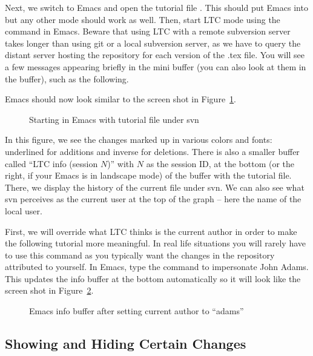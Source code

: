 Next, we switch to Emacs and open the tutorial file .  This should put Emacs into  but any other mode should work as well.  Then, start LTC mode using the command  in Emacs.  Beware that using LTC with a remote subversion server takes longer than using git or a local subversion server, as we have to query the distant server hosting the repository for each version of the .tex file.  You will see a few messages appearing briefly in the mini buffer (you can also look at them in the  buffer), such as the following.
Emacs should now look similar to the screen shot in Figure~\ref{fig:svn-emacs-open}.
\begin{figure}[t]
\centering
{}
\caption{Starting  in Emacs with tutorial file under svn} \label{fig:svn-emacs-open}
\end{figure}
In this figure, we see the changes marked up in various colors and fonts: underlined for additions and inverse for deletions.  There is also a smaller buffer called ``LTC info (session $N$)'' with $N$ as the session ID, at the bottom (or the right, if your Emacs is in landscape mode) of the buffer with the tutorial file.  There, we display the history of the current file under svn.  We can also see what svn perceives as the current user at the top of the graph -- here the name of the local user.

First, we will override what LTC thinks is the current author in order to make the following tutorial more meaningful.  In real life situations you will rarely have to use this command as you typically want the changes in the repository attributed to yourself.  In Emacs, type the command  to impersonate John Adams.  This  updates the info buffer at the bottom automatically so it will look like the screen shot in Figure~\ref{fig:svn-adams}.
\begin{figure}[t]
\centering
{}
\caption{Emacs info buffer after setting current author to ``adams''} \label{fig:svn-adams}
\end{figure}

\subsection{Showing and Hiding Certain Changes}

